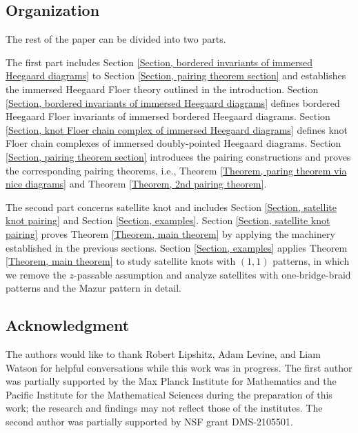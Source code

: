 \documentclass{amsart}
\theoremstyle{definition}
\theoremstyle{remark}
\numberwithin{equation}{section}
\numberwithin{equation}{section} \makeatletter
\begin{document}
\subsection{Organization} 
The rest of the paper can be divided into two parts. 

The first part includes Section \ref{Section, bordered invariants of immersed Heegaard diagrams} to Section \ref{Section, pairing theorem section} and establishes the immersed Heegaard Floer theory outlined in the introduction. Section \ref{Section, bordered invariants of immersed Heegaard diagrams} defines bordered Heegaard Floer invariants of immersed bordered Heegaard diagrams. Section \ref{Section, knot Floer chain complex of immersed Heegaard diagrams} defines knot Floer chain complexes of immersed doubly-pointed Heegaard diagrams. Section \ref{Section, pairing theorem section} introduces the pairing constructions and proves the corresponding pairing theorems, i.e., Theorem \ref{Theorem, paring theorem via nice diagrams} and Theorem \ref{Theorem, 2nd pairing theorem}.  

The second part concerns satellite knot and includes Section \ref{Section, satellite knot pairing} and Section \ref{Section, examples}.
Section \ref{Section, satellite knot pairing} proves Theorem \ref{Theorem, main theorem} by applying the machinery established in the previous sections. Section \ref{Section, examples} applies Theorem \ref{Theorem, main theorem} to study satellite knots with $(1,1)$ patterns, in which we remove the 
$z$-passable assumption and analyze satellites with one-bridge-braid patterns and the Mazur pattern in detail. 

\subsection*{Acknowledgment} The authors would like to thank Robert Lipshitz, Adam Levine, and Liam Watson for helpful conversations while this work was in progress. The first author was partially supported by the Max Planck Institute for Mathematics and the Pacific Institute for the Mathematical Sciences during the preparation of this work; the research and findings may not reflect those of the institutes. The second author was partially supported by NSF grant DMS-2105501.
\end{document}
